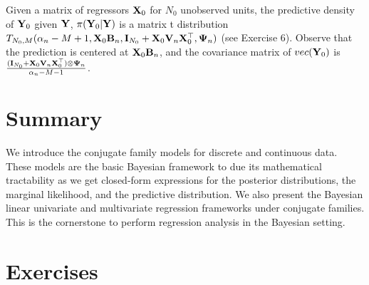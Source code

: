 Given a matrix of regressors ${\bf{X}}_0$ for $N_0$ unobserved units, the predictive density of ${\bf{Y}}_0$ given ${\bf{Y}}$, $\pi({\bf{Y}}_0|{\bf{Y}})$ is a matrix t distribution $T_{N_0,M}(\alpha_n-M+1,{\bf{X}}_0{\bf{B}}_n,{\bf{I}}_{N_0}+{\bf{X}}_0{\bf{V}}_n{\bf{X}}_0^{\top},{\bf{\Psi}}_n)$ (see Exercise 6). Observe that the prediction is centered at ${\bf{X}}_0{\bf{B}}_n$, and the covariance matrix of $vec({\bf{Y}}_0)$ is $\frac{({\bf{I}}_{N_0}+{\bf{X}}_0{\bf{V}}_n{\bf{X}}_0^{\top})\otimes{\bf{\Psi}}_n}{\alpha_n-M-1}$.  

\section{Summary}\label{sec45}
We introduce the conjugate family models for discrete and continuous data. These models are the basic Bayesian framework to due its mathematical tractability as we get closed-form expressions for the posterior distributions, the marginal likelihood, and the predictive distribution. We also present the Bayesian linear univariate and multivariate regression frameworks under conjugate families. This is the cornerstone to perform regression analysis in the Bayesian setting. 

\section{Exercises}\label{sec46}

